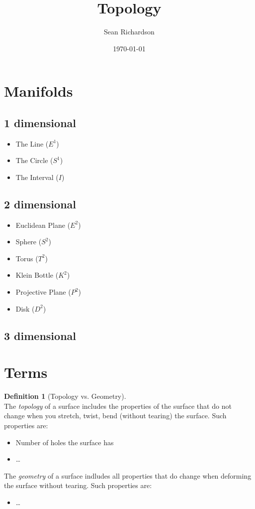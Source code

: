 \documentclass{article}[12pt]
\theoremstyle{definition}
\newtheorem{definition}[theorem]{Definition}
\begin{document}
\title{Topology}
\author{Sean Richardson}
\date{\today}
\maketitle

\section{Manifolds}
\subsection{1 dimensional}
\begin{itemize}
    \item The Line ($E^1$)
    \item The Circle ($S^1$)
    \item The Interval ($I$)
\end{itemize}
\subsection{2 dimensional}
\begin{itemize}
    \item Euclidean Plane ($E^2$)
    \item Sphere ($S^2$)
    \item Torus ($T^2$)
    \item Klein Bottle ($K^2$)
    \item Projective Plane ($P^2$)
    \item Disk ($D^2$)

\end{itemize}

\subsection{3 dimensional}


\section{Terms}
\begin{definition}[Topology vs. Geometry]~\\
    The \emph{topology} of a surface includes the properties of the surface that do not change when you stretch, twist, bend (without tearing) the surface. Such properties are:
    \begin{itemize}
        \item Number of holes the surface has
        \item \dots
    \end{itemize}
    The \emph{geometry} of a surface indludes all properties that do change when deforming the surface without tearing. Such properties are:
    \begin{itemize}
        \item \dots
    \end{itemize}
\end{definition}
\end{document}
